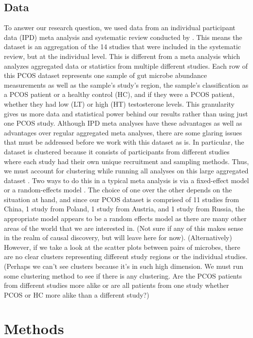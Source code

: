 \documentclass[12pt,letterpaper]{article}
\begin{document}
\subsection{Data}
To answer our research question, we used data from an individual participant data (IPD) meta analysis and systematic review conducted by \citep{yang2024pcos}. This means the dataset is an aggregation of the 14 studies that were included in the systematic review, but at the individual level. This is different from a meta analysis which analyzes aggregated data or statistics from multiple different studies. Each row of this PCOS dataset represents one sample of gut microbe abundance measurements as well as the sample's study's region, the sample's classification as a PCOS patient or a healthy control (HC), and if they were a PCOS patient, whether they had low (LT) or high (HT) testosterone levels. This granularity gives us more data and statistical power behind our results rather than using just one PCOS study. Although IPD meta analyses have these advantages as well as advantages over regular aggregated meta analyses, there are some glaring issues that must be addressed before we work with this dataset as is. In particular, the dataset is clustered because it consists of participants from different studies where each study had their own unique recruitment and sampling methods. Thus, we must account for clustering while running all analyses on this large aggregated dataset \citep{riley2010ipdma}. Two ways to do this in a typical meta analysis is via a fixed-effect model or a random-effects model \citep{dettori2022fixedrandomeffect}. The choice of one over the other depends on the situation at hand, and since our PCOS dataset is comprised of 11 studies from China, 1 study from Poland, 1 study from Austria, and 1 study from Russia, the appropriate model appears to be a random effects model as there are many other areas of the world that we are interested in. (Not sure if any of this makes sense in the realm of causal discovery, but will leave here for now). (Alternatively) However, if we take a look at the scatter plots between pairs of microbes, there are no clear clusters representing different study regions or the individual studies. (Perhaps we can't see clusters because it's in such high dimension. We must run some clustering method to see if there is any clustering. Are the PCOS patients from different studies more alike or are all patients from one study whether PCOS or HC more alike than a different study?)

\section{Methods}
\end{document}
